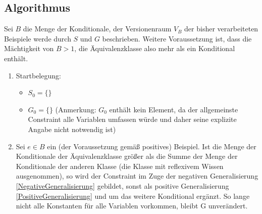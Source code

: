 \documentclass[a4paper, 11pt]{book}
\begin{document}
	\subsection{Algorithmus}
	Sei $ B $ die Menge der Konditionale, der Versionenraum $ V_B $ der bisher verarbeiteten Beispiele werde durch $ S $ und  $ G $ beschrieben. Weitere Voraussetzung ist, dass die Mächtigkeit von $ B  > 1$, die Äquivalenzklasse also mehr als ein Konditional enthält.  
	\begin{enumerate}
		\item Startbelegung:
		\begin{itemize}
			\item $ S_0 = \{\}$ 
			\item $ G_0 = \{\} $ (Anmerkung: $ G_0 $ enthält kein Element, da der allgemeinste Constraint alle Variablen umfassen würde und daher seine explizite Angabe nicht notwendig ist)
		\end{itemize}
		\item Sei $ e \in B $ ein (der Voraussetzung gemäß positives) Beispiel. Ist die Menge der Konditionale der Äquivalenzklasse größer als die Summe der Menge der Konditionale der anderen Klasse (die Klasse mit reflexivem Wissen ausgenommen), so wird der Constraint im Zuge der negativen Generalisierung \ref{NegativeGeneralisierung} gebildet, sonst als positive Generalisierung \ref{PositiveGeneralisierung} und um das weitere Konditional ergänzt. So lange nicht alle Konstanten für alle Variablen vorkommen, bleibt G unverändert. 
	\end{enumerate}
\end{document}
